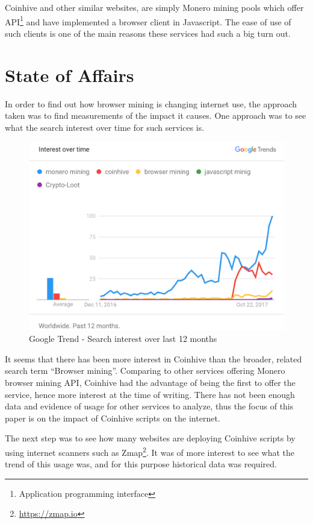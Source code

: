 Coinhive and other similar websites, are simply Monero mining pools which offer API\footnote{Application programming interface} and have implemented a browser client in Javascript. The ease of use of such clients is one of the main reasons these services had such a big turn out. 



\section{State of Affairs}


In order to find out how browser mining is changing internet use, the approach taken was to find measurements of the impact it causes. One approach was to see what the search interest over time for such services is. 

\begin{figure}[t]
\centering
\includegraphics[width=\linewidth]{figures/usage_over_time2.png}
\caption{Google Trend - Search interest over last 12 months}
\end{figure}

It seems that there has been more interest in Coinhive than the broader, related search term ``Browser mining''. Comparing to other services offering Monero browser mining API, Coinhive had the advantage of being the first to offer the service, hence more interest at the time of writing. There has not been enough data and evidence of usage for other services to analyze, thus the focus of this paper is on the impact of Coinhive scripts on the internet. 

The next step was to see how many websites are deploying Coinhive scripts by using internet scanners such as Zmap\footnote{\url{https://zmap.io}}. It was of more interest to see what the trend of this usage was, and for this purpose historical data was required. 

